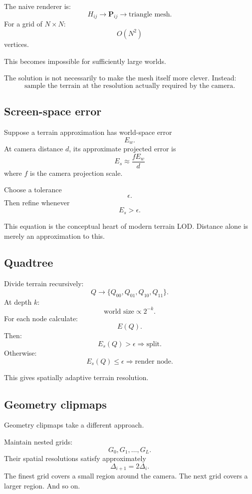 \documentclass[12pt]{article}
\begin{document}
	The naive renderer is:
	\[
	H_{ij} \rightarrow \mathbf P_{ij} \rightarrow \text{triangle mesh}.
	\]
	For a grid of $N\times N$:
	\[
	O(N^2)
	\]
	vertices.
	
	This becomes impossible for sufficiently large worlds.
	
	The solution is not necessarily to make the mesh itself more clever.
	Instead:
	\[
	\boxed{
		\text{sample the terrain at the resolution actually required by the camera}.
	}
	\]
	
	\subsection{Screen-space error}
	
	Suppose a terrain approximation has world-space error
	\[
	E_w.
	\]
	At camera distance $d$, its approximate projected error is
	\[
	\boxed{
		E_s \approx \frac{fE_w}{d}
	}
	\]
	where $f$ is the camera projection scale.
	
	Choose a tolerance
	\[
	\epsilon.
	\]
	Then refine whenever
	\[
	\boxed{
		E_s>\epsilon.
	}
	\]
	
	This equation is the conceptual heart of modern terrain LOD.
	Distance alone is merely an approximation to this.
	
	\subsection{Quadtree}
	
	Divide terrain recursively:
	\[
	Q\rightarrow \{Q_{00},Q_{01},Q_{10},Q_{11}\}.
	\]
	At depth $k$:
	\[
	\text{world size}\propto 2^{-k}.
	\]
	For each node calculate:
	\[
	E(Q).
	\]
	Then:
	\[
	\boxed{
		E_s(Q)>\epsilon \Rightarrow \text{split}.
	}
	\]
	Otherwise:
	\[
	\boxed{
		E_s(Q)\le\epsilon \Rightarrow \text{render node}.
	}
	\]
	
	This gives spatially adaptive terrain resolution.
	
	\subsection{Geometry clipmaps}
	
	Geometry clipmaps take a different approach.
	
	Maintain nested grids:
	\[
	G_0,G_1,\ldots,G_L.
	\]
	Their spatial resolutions satisfy approximately
	\[
	\boxed{
		\Delta_{i+1}=2\Delta_i.
	}
	\]
	The finest grid covers a small region around the camera.
	The next grid covers a larger region.
	And so on.
	
\end{document}
